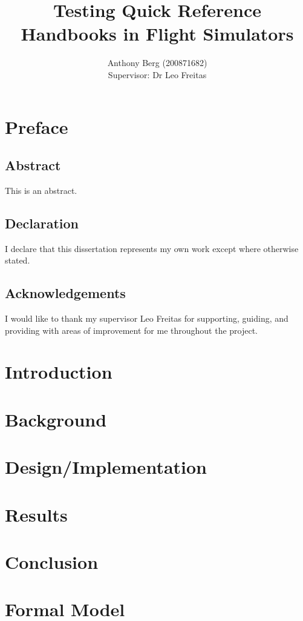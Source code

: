 \documentclass[british, twoside]{report}
\author{Anthony Berg (200871682)\\
Supervisor: Dr Leo Freitas}
\title{Testing Quick Reference Handbooks in Flight Simulators}
\begin{document}
\maketitle

\chapter*{Preface}
\section*{Abstract}
This is an abstract.

\section*{Declaration}
I declare that this dissertation represents my own work except where otherwise stated.

\section*{Acknowledgements}
I would like to thank my supervisor Leo Freitas for supporting, guiding, and providing
with areas of improvement for me throughout the project.

\tableofcontents

\chapter{Introduction}


\chapter{Background}


\chapter{Design/Implementation}


\chapter{Results}


\chapter{Conclusion}


\appendix
\chapter{Formal Model}


\nocite{*}
\printbibliography[heading=bibintoc, title={References}]
\end{document}
